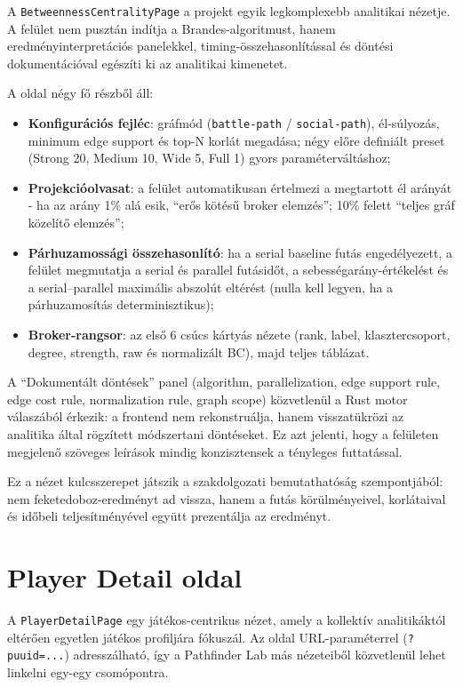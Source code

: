 ﻿\documentclass[a4paper,12pt]{report}
\begin{document}
A \texttt{BetweennessCentralityPage} a projekt egyik legkomplexebb analitikai nézetje. A felület nem pusztán indítja a Brandes-algoritmust, hanem eredményinterpretációs panelekkel, timing-összehasonlítással és döntési dokumentációval egészíti ki az analitikai kimenetet.

A oldal négy fő részből áll:

\begin{itemize}
    \item \textbf{Konfigurációs fejléc}: gráfmód (\texttt{battle-path} / \texttt{social-path}), él-súlyozás, minimum edge support és top-N korlát megadása; négy előre definiált preset (Strong 20, Medium 10, Wide 5, Full 1) gyors paraméterváltáshoz;
    \item \textbf{Projekcióolvasat}: a felület automatikusan értelmezi a megtartott él arányát - ha az arány 1\% alá esik, ``erős kötésű broker elemzés''; 10\% felett ``teljes gráf közelítő elemzés'';
    \item \textbf{Párhuzamossági összehasonlító}: ha a serial baseline futás engedélyezett, a felület megmutatja a serial és parallel futásidőt, a sebességarány-értékelést és a serial--parallel maximális abszolút eltérést (nulla kell legyen, ha a párhuzamosítás determinisztikus);
    \item \textbf{Broker-rangsor}: az első 6 csúcs kártyás nézete (rank, label, klasztercsoport, degree, strength, raw és normalizált BC), majd teljes táblázat.
\end{itemize}

A ``Dokumentált döntések'' panel (algorithm, parallelization, edge support rule, edge cost rule, normalization rule, graph scope) közvetlenül a Rust motor válaszából érkezik: a frontend nem rekonstruálja, hanem visszatükrözi az analitika által rögzített módszertani döntéseket. Ez azt jelenti, hogy a felületen megjelenő szöveges leírások mindig konzisztensek a tényleges futtatással.

Ez a nézet kulcsszerepet játszik a szakdolgozati bemutathatóság szempontjából: nem feketedoboz-eredményt ad vissza, hanem a futás körülményeivel, korlátaival és időbeli teljesítményével együtt prezentálja az eredményt.

\section{Player Detail oldal}

A \texttt{PlayerDetailPage} egy játékos-centrikus nézet, amely a kollektív analitikáktól eltérően egyetlen játékos profiljára fókuszál. Az oldal URL-paraméterrel (\texttt{?puuid=...}) adresszálható, így a Pathfinder Lab más nézeteiből közvetlenül lehet linkelni egy-egy csomópontra.
\end{document}

